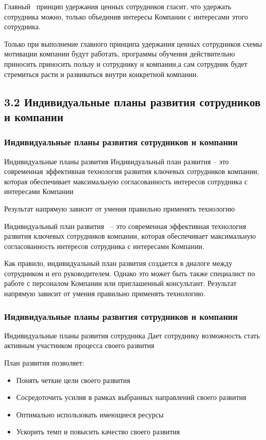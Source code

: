 \documentclass{../industrial-development}
\begin{document}
\lecturenotes

Главный~\cite{IPl} принцип удержания ценных сотрудников гласит, что удержать сотрудника можно, только объединив интересы Компании с интересами этого сотрудника.

Только при выполнение главного принципа удержания ценных сотрудников схемы мотивации компании будут работать, программы обучения действительно приносить приносить пользу и сотруднику и компании,а сам сотрудник будет стремиться расти и развиваться внутри конкретной компании.


\subsection{3.2 Индивидуальные планы развития сотрудников и компании }


\begin{frame} \frametitle{Индивидуальные планы развития сотрудников и компании}
  \begin{block}{Индивидуальные планы развития}
 \alert{Индивидуальный план развития} – это современная эффективная технология развития ключевых сотрудников компании, которая обеспечивает максимальную согласованность интересов сотрудника с интересами Компании
  \end{block}
  
  \bigskip
Результат напрямую зависит от умения правильно применять технологию

\end{frame}

\lecturenotes

Индивидуальный план развития~\cite{IPl} – это современная эффективная технология развития ключевых сотрудников компании, которая обеспечивает максимальную согласованность интересов сотрудника с интересами Компании.

Как правило, индивидуальный план развития создается в диалоге между сотрудником и его руководителем. Однако это может быть также специалист по работе с персоналом Компании или приглашенный консультант. Результат напрямую зависит от умения правильно применять технологию.


\begin{frame} \frametitle{Индивидуальные планы развития сотрудников и компании}
  \begin{block}{Индивидуальные планы развития сотрудника}
Дает сотруднику возможность стать активным участником процесса своего развития
  \end{block}
   \bigskip 
План развития позволяет:
   \begin{itemize}
  \item Понять четкие цели своего развития
  \item Сосредоточить усилия в рамках выбранных направлений своего развития
  \item Оптимально использовать имеющиеся ресурсы
 \item Ускорить темп и повысить качество своего развития
  \end{itemize}
\end{frame}
\end{document}

